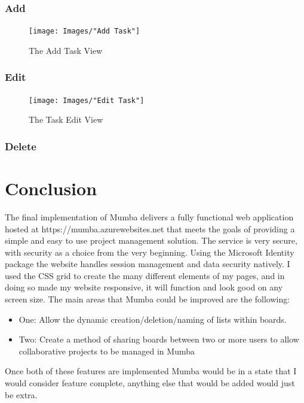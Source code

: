 \documentclass[letterpaper]{article}
\begin{document}
\subsubsection{Add}

\begin{figure}[H]
  \centering
  \caption{The Add Task View}
  \texttt{[image: Images/"Add Task"]}
\end{figure}
\subsubsection{Edit}

\begin{figure}[H]
  \centering
  \caption{The Task Edit View}
  \texttt{[image: Images/"Edit Task"]}
\end{figure}
\subsubsection{Delete}






\pagebreak
\section{Conclusion}
The final implementation of Mumba delivers a fully functional web application hosted at https://mumba.azurewebsites.net that meets the goals of providing a simple and easy to use project management solution. The service is very secure, with security as a choice from the very beginning. Using the Microsoft Identity package the website handles session management and data security natively. I used the CSS grid to create the many different elements of my pages, and in doing so made my website responsive, it will function and look good on any screen size. The main areas that Mumba could be improved are the following:
\begin{itemize}
  \item One: Allow the dynamic creation/deletion/naming of lists within boards.
  \item Two: Create a method of sharing boards between two or more users to allow collaborative projects to be managed in Mumba
\end{itemize}
Once both of these features are implemented Mumba would be in a state that I would consider feature complete, anything else that would be added would just be extra.
\end{document}
